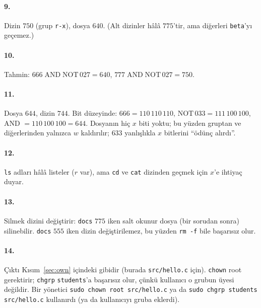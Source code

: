 \documentclass[11pt,a4paper]{article}
\newcommand{\cmd}[1]{\texttt{#1}}
\begin{document}
\paragraph{9.} Dizin $750$ (grup \texttt{r-x}), dosya $640$. (Alt dizinler hâlâ $775$'tir, ama diğerleri \texttt{beta}'yı geçemez.)


\paragraph{10.} Tahmin: $666 \mathbin{\text{AND}} \text{NOT}\,027 = 640$, $777 \mathbin{\text{AND}} \text{NOT}\,027 = 750$.


\paragraph{11.} Dosya $644$, dizin $744$. Bit düzeyinde: $666 = 110\,110\,110$, $\text{NOT}\,033 = 111\,100\,100$, AND $= 110\,100\,100 = 644$. Dosyanın hiç $x$ biti yoktu; bu yüzden gruptan ve diğerlerinden yalnızca $w$ kaldırılır; $633$ yanlışlıkla $x$ bitlerini ``ödünç alırdı''.


\paragraph{12.} \cmd{ls} adları hâlâ listeler ($r$ var), ama \cmd{cd} ve \cmd{cat} dizinden geçmek için $x$'e ihtiyaç duyar.


\paragraph{13.} Silmek dizini değiştirir: \texttt{docs} $775$ iken salt okunur dosya (bir sorudan sonra) silinebilir. \texttt{docs} $555$ iken dizin değiştirilemez, bu yüzden \cmd{rm -f} bile başarısız olur.


\paragraph{14.} Çıktı Kısım~\ref{sec:own} içindeki gibidir (burada \texttt{src/hello.c} için). \cmd{chown} root gerektirir; \cmd{chgrp} \texttt{students}'a başarısız olur, çünkü kullanıcı o grubun üyesi değildir. Bir yönetici \cmd{sudo chown root src/hello.c} ya da \cmd{sudo chgrp students src/hello.c} kullanırdı (ya da kullanıcıyı gruba eklerdi).
\end{document}
